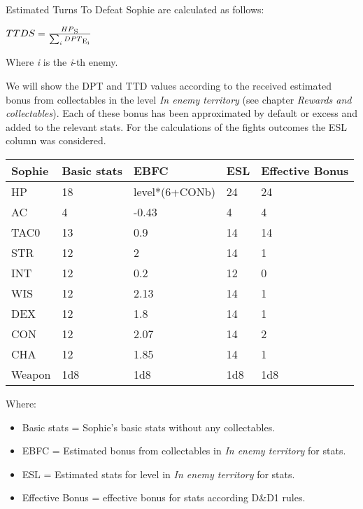 Estimated Turns To Defeat Sophie are calculated as follows:
\begin{center}
$TTDS=\frac{HP\textsubscript{S}}{\sum_{i}DPT\textsubscript{E\textsubscript{i}}}$
\end{center}
Where \textit{i} is the \textit{i}-th enemy.

We will show the DPT and TTD values according to the received estimated bonus from collectables in the level \textit{In enemy territory} (see chapter \textit{Rewards and collectables}). Each of these bonus has been approximated by default or excess and added to the relevant stats. For the calculations of the fights outcomes the ESL column was considered.
\begin{table}[H]
  \centering
\begin{tabular}{|l|l|l|l|l|}
\hline
\rowcolor[HTML]{C0C0C0} 
\textbf{Sophie} & \textbf{Basic stats} & \textbf{EBFC} & \textbf{ESL} & \textbf{Effective Bonus} \\ \hline
HP & 18 & level*(6+CONb) & 24 & 24 \\ \hline
AC & 4 & -0.43 & 4 & 4 \\ \hline
TAC0 & 13 & 0.9 & 14 & 14 \\ \hline
STR & 12 & 2 & 14 & 1 \\ \hline
INT & 12 & 0.2 & 12 & 0 \\ \hline
WIS & 12 & 2.13 & 14 & 1 \\ \hline
DEX & 12 & 1.8 & 14 & 1 \\ \hline
CON & 12 & 2.07 & 14 & 2 \\ \hline
CHA & 12 & 1.85 & 14 & 1 \\ \hline
Weapon & 1d8 & 1d8 & 1d8 & 1d8 \\ \hline
\end{tabular}
\end{table}
Where:
\begin{itemize}
	\item Basic stats = Sophie's basic stats without any collectables.
	\item EBFC = Estimated bonus from collectables in \textit{In enemy territory} for stats.
	\item ESL = Estimated stats for level in \textit{In enemy territory} for stats.
	\item Effective Bonus = effective bonus for stats according D\&{}D1 rules.
\end{itemize}

